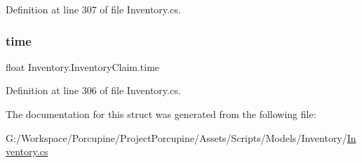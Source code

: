 Definition at line 307 of file Inventory.\+cs.

\mbox{\label{struct_inventory_1_1_inventory_claim_adc1cc66a0221f501d54fc6d2b922d2f5}} 
\subsubsection{\texorpdfstring{time}{time}}
{\footnotesize\ttfamily float Inventory.\+Inventory\+Claim.\+time}



Definition at line 306 of file Inventory.\+cs.



The documentation for this struct was generated from the following file\+:\begin{DoxyCompactItemize}
\item 
G\+:/\+Workspace/\+Porcupine/\+Project\+Porcupine/\+Assets/\+Scripts/\+Models/\+Inventory/\hyperlink{_inventory_8cs}{Inventory.\+cs}\end{DoxyCompactItemize}
